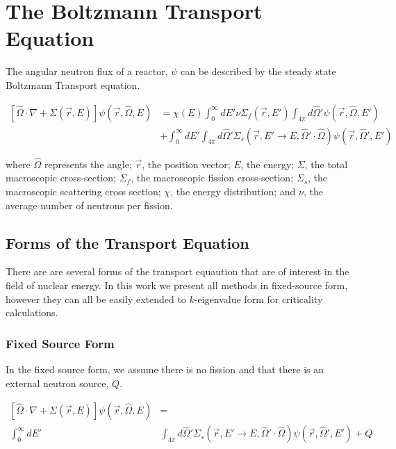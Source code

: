 \section{The Boltzmann Transport Equation}
The angular neutron flux of a reactor, $\psi$ can be described by the steady state Boltzmann Transport equation.

\begin{equation}
\begin{split}
 [\hat{\Omega} \cdot \nabla + \Sigma(\vec{r}, E)]\psi(\vec{r}, \hat{\Omega}, E) &= \chi(E) \int_0^\infty dE' \nu \Sigma_{f}(\vec{r}, E') \int_{4\pi} d\hat{\Omega}'\psi(\vec{r}, \hat{\Omega}, E') \\   &+ \int_0^\infty dE' \int_{4\pi} d\hat{\Omega}' \Sigma_s(\vec{r}, E' \rightarrow E, \hat{\Omega}' \cdot \hat{\Omega})\psi(\vec{r}, \hat{\Omega}', E')   
\end{split}
\label{eq:transport}
\end{equation}


where $\hat{\Omega}$ represents the angle; $\vec{r}$, the position vector; $E$, the energy; $\Sigma$, the total macroscopic cross-section; $\Sigma_f$, the macroscopic fission cross-section; $\Sigma_s$, the macroscopic scattering cross section; $\chi$, the energy distribution; and $\nu$, the average number of neutrons per fission. 

\subsection{Forms of the Transport Equation}
There are are several forms of the transport equaution that are of interest in the field of nuclear energy. In this work we present all methods in fixed-source form, however they can all be easily extended to $k$-eigenvalue form for criticality calculations. 

\subsubsection{Fixed Source Form}
In the fixed source form, we assume there is no fission and that there is an external neutron source, $Q$.

\begin{equation}
\begin{split}
 [\hat{\Omega} \cdot \nabla + \Sigma(\vec{r}, E)]\psi(\vec{r}, \hat{\Omega}, E) &= \\ \int_0^\infty dE' &\int_{4\pi} d\hat{\Omega}' \Sigma_s(\vec{r}, E' \rightarrow E, \hat{\Omega}' \cdot \hat{\Omega})\psi(\vec{r}, \hat{\Omega}', E')  +Q 
\end{split}
 \label{eq:transport_fixed_source}
\end{equation}

